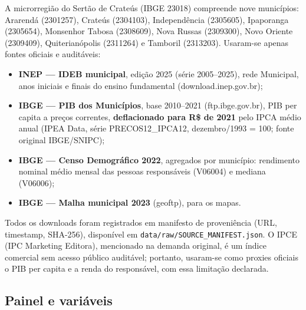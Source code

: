\documentclass[12pt,a4paper]{article}
\begin{document}
A microrregião do Sertão de Crateús (IBGE 23018) compreende nove municípios: Ararendá (2301257), Crateús (2304103), Independência (2305605), Ipaporanga (2305654), Monsenhor Tabosa (2308609), Nova Russas (2309300), Novo Oriente (2309409), Quiterianópolis (2311264) e Tamboril (2313203). Usaram-se apenas fontes oficiais e auditáveis:

\begin{itemize}
\item \textbf{INEP --- IDEB municipal}, edição 2025 (série 2005--2025), rede Municipal, anos iniciais e finais do ensino fundamental (download.inep.gov.br);
\item \textbf{IBGE --- PIB dos Municípios}, base 2010--2021 (ftp.ibge.gov.br), PIB per capita a preços correntes, \textbf{deflacionado para R\$ de 2021} pelo IPCA médio anual (IPEA Data, série PRECOS12\_IPCA12, dezembro/1993 = 100; fonte original IBGE/SNIPC);
\item \textbf{IBGE --- Censo Demográfico 2022}, agregados por município: rendimento nominal médio mensal das pessoas responsáveis (V06004) e mediana (V06006);
\item \textbf{IBGE --- Malha municipal 2023} (geoftp), para os mapas.
\end{itemize}

Todos os downloads foram registrados em manifesto de proveniência (URL, timestamp, SHA-256), disponível em \texttt{data/raw/SOURCE\_MANIFEST.json}. O IPCE (IPC Marketing Editora), mencionado na demanda original, é um índice comercial sem acesso público auditável; portanto, usaram-se como proxies oficiais o PIB per capita e a renda do responsável, com essa limitação declarada.

\subsection{Painel e variáveis}
\end{document}
